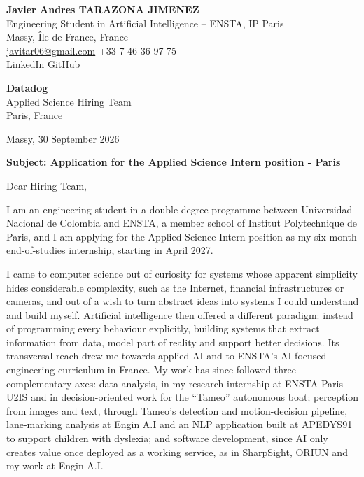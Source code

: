 \documentclass[11pt,a4paper]{article}
\begin{document}
\begin{minipage}[t]{0.64\textwidth}
\textbf{\large Javier Andres TARAZONA JIMENEZ}\\
{\small Engineering Student in Artificial Intelligence -- ENSTA, IP Paris}\\
{\small Massy, Île-de-France, France}\\
{\small \href{mailto:javitar06@gmail.com}{javitar06@gmail.com} \textbullet{} +33 7 46 36 97 75}\\
{\small \href{https://www.linkedin.com/in/javier-andres-tarazona-jimenez-84b489222/}{LinkedIn} \textbullet{} \href{https://github.com/JavierTarazona06}{GitHub}}
\end{minipage}
\hfill
\begin{minipage}[t]{0.34\textwidth}
\raggedleft
\textbf{Datadog}\\
{\small Applied Science Hiring Team}\\
{\small Paris, France}
\end{minipage}

\vspace{0.4cm}

{\raggedleft Massy, 30 September 2026\par}

\vspace{0.2cm}

\textbf{Subject: Application for the Applied Science Intern position - Paris}

\vspace{0.1cm}

Dear Hiring Team,

I am an engineering student in a double-degree programme between Universidad Nacional de Colombia and ENSTA, a member school of Institut Polytechnique de Paris, and I am applying for the Applied Science Intern position as my six-month end-of-studies internship, starting in April 2027.

I came to computer science out of curiosity for systems whose apparent simplicity hides considerable complexity, such as the Internet, financial infrastructures or cameras, and out of a wish to turn abstract ideas into systems I could understand and build myself. Artificial intelligence then offered a different paradigm: instead of programming every behaviour explicitly, building systems that extract information from data, model part of reality and support better decisions. Its transversal reach drew me towards applied AI and to ENSTA's AI-focused engineering curriculum in France. My work has since followed three complementary axes: data analysis, in my research internship at ENSTA Paris -- U2IS and in decision-oriented work for the ``Tameo'' autonomous boat; perception from images and text, through Tameo's detection and motion-decision pipeline, lane-marking analysis at Engin A.I and an NLP application built at APEDYS91 to support children with dyslexia; and software development, since AI only creates value once deployed as a working service, as in SharpSight, ORIUN and my work at Engin A.I.
\end{document}
